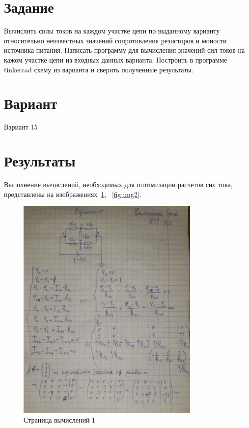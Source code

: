 \documentclass[a4paper, 14pt]{extarticle}
\begin{document}
\renewcommand{\ttdefault}{pcr}

\setlength{\tabcolsep}{3pt}
\newpage
\setcounter{page}{2}

\section{Задание}\label{Sect::task}

Вычислить силы токов на каждом участке цепи по выданному варианту относительно неизвестных значений сопротивления резисторов и моности источника питания.
Написать программу для вычисления значений сил токов на кажом участке цепи из входных данных варианта.
Построить в программе tinkercad схему из варианта и сверить полученные результаты.

\section{Вариант}\label{Sect::var}
Вариант 15

\section{Результаты}\label{Sect::res}

Выполнение вычислений, необходимых для оптимизации расчетов сил тока, представлены на изображениях~\ref{fig:img1}, ~\ref{fig:img2}.

\begin{figure}[!htb]
	\centering
	\includegraphics[width=0.8\textwidth]{img1}
\caption{Страница вычислений 1}
\label{fig:img1}
\end{figure}
\end{document}

